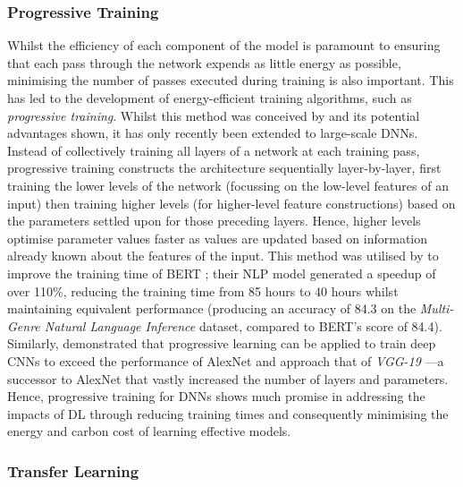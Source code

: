 \documentclass[a4paper, 12pt]{article}
\begin{document}
    \subsubsection{Progressive Training}

    Whilst the efficiency of each component of the model is paramount to ensuring that each pass through the network expends as little energy as possible, minimising the number of passes executed during training is also important. This has led to the development of energy-efficient training algorithms, such as \emph{progressive training}. Whilst this method was conceived by  and its potential advantages shown, it has only recently been extended to large-scale DNNs. Instead of collectively training all layers of a network at each training pass, progressive training constructs the architecture sequentially layer-by-layer, first training the lower levels of the network (focussing on the low-level features of an input) then training  higher levels (for higher-level feature constructions) based on the parameters settled upon for those preceding layers. Hence, higher levels optimise parameter values faster as values are updated based on information already known about the features of the input. This method was utilised by  to improve the training time of BERT \cite{devlin-2019}; their NLP model generated a speedup of over 110\%, reducing the training time from 85 hours to 40 hours whilst maintaining equivalent performance (producing an accuracy of 84.3 on the \emph{Multi-Genre Natural Language Inference} dataset, compared to BERT's score of 84.4). Similarly,  demonstrated that progressive learning can be applied to train deep CNNs to exceed the performance of AlexNet and approach that of \emph{VGG-19} \cite{simonyan-2014}---a successor to AlexNet that vastly increased the number of layers and parameters. Hence, progressive training for DNNs shows much promise in addressing the impacts of DL through reducing training times and consequently minimising the energy and carbon cost of learning effective models.

    \subsubsection{Transfer Learning}
\end{document}
